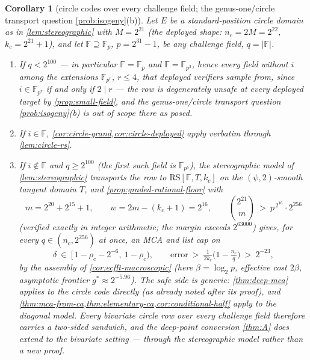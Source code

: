 \documentclass[11pt]{article}
\newtheorem{corollary}[corollary]{Corollary}
\theoremstyle{definition}
\theoremstyle{remark}
\newcommand{\F}{\mathbb{F}}
\newcommand{\RS}{\mathrm{RS}}
\begin{document}
\begin{corollary}[circle codes over every challenge field; the genus-one/circle transport question \cref{prob:isogeny}\textup{(b)}]\label{cor:circle-anyfield}
Let $E$ be a standard-position circle domain as in \cref{lem:stereographic} with $M=2^{21}$ \textup(the deployed shape: $n_c=2M=2^{22}$, $k_c=2^{21}+1$\textup), and let $\F\supseteq\F_p$, $p=2^{31}-1$, be any challenge field, $q=|\F|$.
\begin{enumerate}[label=\textup{(\roman*)}]
\item If $q<2^{100}$ --- in particular $\F=\F_p$ and $\F=\F_{p^3}$, hence every field without $i$ among the extensions $\F_{p^r}$, $r\le4$, that deployed verifiers sample from, since $i\in\F_{p^r}$ if and only if $2\mid r$ --- the row is degenerately unsafe at every deployed target by \cref{prop:small-field}, and the genus-one/circle transport question \cref{prob:isogeny}\textup{(b)} is out of scope there as posed.
\item If $i\in\F$, \cref{cor:circle-grand,cor:circle-deployed} apply verbatim through \cref{lem:circle-rs}.
\item If $i\notin\F$ and $q\ge2^{100}$ \textup(the first such field is $\F_{p^5}$\textup), the stereographic model of \cref{lem:stereographic} transports the row to $\RS[\F,T,k_c]$ on the $(\psi,2)$-smooth tangent domain $T$, and \cref{prop:graded-rational-floor} with
\[
m=2^{20}+2^{15}+1,\qquad w=2m-(k_c+1)=2^{16},\qquad
\binom{2^{21}}{m}\ >\ p^{\,2^{16}}\cdot2^{256}
\]
\textup(verified exactly in integer arithmetic; the margin exceeds $2^{63000}$\textup) gives, for every $q\in(n_c,2^{256})$ at once, an MCA and list cap on
\[
\delta\ \in\ \bigl[\,1-\rho_c-2^{-6},\ 1-\rho_c\bigr),
\qquad
\text{error}\ >\ \tfrac1{2k_c}\bigl(1-\tfrac{n_c}q\bigr)\ >\ 2^{-23},
\]
by the assembly of \cref{cor:ecfft-macroscopic} \textup(here $\beta=\log_2p$, effective cost $2\beta$, asymptotic frontier $g^*\approx2^{-5.96}$\textup). The safe side is generic: \cref{thm:deep-mca} applies to the circle code directly \textup(as already noted after its proof\textup), and \cref{thm:mca-from-ca,thm:elementary-ca,cor:conditional-half} apply to the diagonal model. Every bivariate circle row over every challenge field therefore carries a two-sided sandwich, and the deep-point conversion \cref{thm:A} does extend to the bivariate setting --- through the stereographic model rather than a new proof.
\end{enumerate}
\end{corollary}
\end{document}
